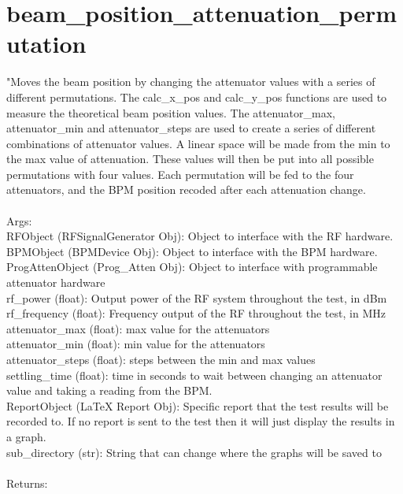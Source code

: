 \documentclass[a4paper, 11pt]{article}%
\begin{document}
\section{beam\_position\_attenuation\_permutation}%
"Moves the beam position by changing the attenuator values with a series of different permutations.
    The calc\_x\_pos and calc\_y\_pos functions are used to measure the theoretical beam position values.
    The attenuator\_max, attenuator\_min and attenuator\_steps are used to create a series of different 
    combinations of attenuator values. A linear space will be made from the min to the max value of 
    attenuation. These values will then be put into all possible permutations with four values. Each 
    permutation will be fed to the four attenuators, and the BPM position recoded after each 
    attenuation change. \\~\\
    Args:\\
        RFObject (RFSignalGenerator Obj): Object to interface with the RF hardware.\\
        BPMObject (BPMDevice Obj): Object to interface with the BPM hardware.\\
        ProgAttenObject (Prog\_Atten Obj): Object to interface with programmable attenuator hardware\\
        rf\_power (float): Output power of the RF system throughout the test, in dBm \\
        rf\_frequency (float): Frequency output of the RF throughout the test, in MHz\\
        attenuator\_max (float): max value for the attenuators\\
        attenuator\_min (float): min value for the attenuators\\
        attenuator\_steps (float): steps between the min and max values\\
        settling\_time (float): time in seconds to wait between changing an attenuator value and 
            taking a reading from the BPM. \\
        ReportObject (LaTeX Report Obj): Specific report that the test results will be recorded 
            to. If no report is sent to the test then it will just display the results in 
            a graph. \\
        sub\_directory (str): String that can change where the graphs will be saved to\\~\\
    Returns:\\
\end{document}
